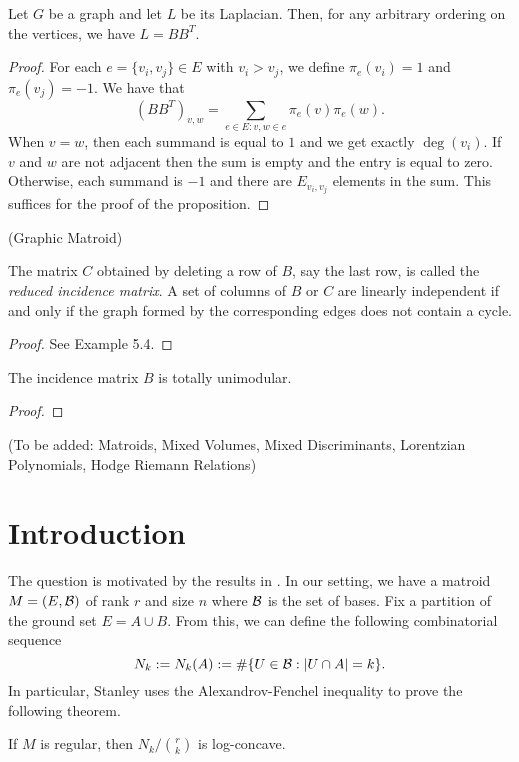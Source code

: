 \documentclass[12pt]{article}
\begin{document}
\begin{prop}
	Let $G$ be a graph and let $L$ be its Laplacian. Then, for any arbitrary ordering on the vertices, we have $L = BB^T$. 
\end{prop}

\begin{proof}
	For each $e = \{v_i, v_j\} \in E$ with $v_i > v_j$, we define $\pi_e(v_i) = 1$ and $\pi_e(v_j) = -1$. We have that
	\[
		(BB^T)_{v,w} = \sum_{e \in E : v, w \in e} \pi_e(v) \pi_e(w).
	\]
	When $v = w$, then each summand is equal to $1$ and we get exactly $\deg (v_i)$. If $v$ and $w$ are not adjacent then the sum is empty and the entry is equal to zero. Otherwise, each summand is $-1$ and there are $E_{v_i, v_j}$ elements in the sum. This suffices for the proof of the proposition.
\end{proof}

\begin{defn}
	(Graphic Matroid)
\end{defn}


\begin{lem}
	The matrix $C$ obtained by deleting a row of $B$, say the last row, is called the \textit{reduced incidence matrix}. A set of columns of $B$ or $C$ are linearly independent if and only if the graph formed by the corresponding edges does not contain a cycle. 
\end{lem}

\begin{proof}
	See \cite{bapat_raghavan_1997} Example 5.4.
\end{proof}

\begin{lem}
	The incidence matrix $B$ is totally unimodular. 
\end{lem}

\begin{proof}
	
\end{proof}

(To be added: Matroids, Mixed Volumes, Mixed Discriminants, Lorentzian Polynomials, Hodge Riemann Relations)

\section{Introduction}

The question is motivated by the results in \cite{STANLEY}. In our setting, we have a matroid $M = (E, \mathcal{B})$ of rank $r$ and size $n$ where $\mathcal{B}$ is the set of bases. Fix a partition of the ground set $E = A \cup B$. From this, we can define the following combinatorial sequence
\[
	N_k := N_k(A) := \# \{U \in \mathcal{B} : |U \cap A| = k\}.
\]
In particular, Stanley uses the Alexandrov-Fenchel inequality to prove the following theorem. 
\begin{thm} \label{stanley-theorem}
	If $M$ is regular, then $N_k / \binom{r}{k}$ is log-concave. 
\end{thm}
\end{document}
